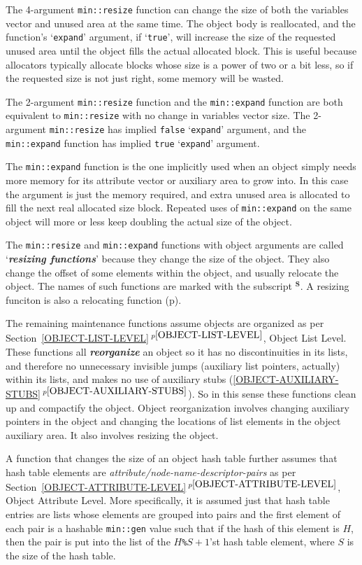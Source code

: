 \documentclass[12pt]{article}
\makeatletter
\newcommand{\skey}[2]{{\bf \em #1#2}\index{#1}}
\newcommand{\ikey}[2]{{\bf \em #1}\index{#2}}
\newcommand{\subsmkey}[2]{$\mathbf{^{#1}}$\index{#1@$^{#1}$!#2}}
\newcommand{\itemref}[1]{\ref{#1}$\,^{p\pageref{#1}}$}
\newcommand{\pagref}[1]{p\pageref{#1}}
\newcommand{\EOL}{\penalty \exhyphenpenalty}
\makeatother
\begin{document}
The 4-argument {\tt min::resize} function can change
the size of both the variables vector and unused area at the same
time.  The object body is reallocated, and the function's
`{\tt expand}' argument, if `{\tt true}', will increase
the size of the requested unused area until the object fills
the actual allocated block.  This is useful because allocators
typically allocate blocks whose size is a power of two or
a bit less, so if the requested size is not just right, some
memory will be wasted.

The 2-argument {\tt min::resize} function and the {\tt min::\EOL expand}
function are both equivalent to {\tt min::\EOL resize} with no change
in variables vector size.  The 2-argument {\tt min::\EOL resize}
has implied {\tt false} `{\tt expand}' argument, and the
{\tt min::\EOL expand} function has implied {\tt true} `{\tt expand}'
argument.

The {\tt min::expand} function is the one implicitly used when an object simply
needs more memory for its attribute vector or auxiliary area to grow into.
In this case the argument is just the memory required, and extra unused
area is allocated to fill the next real allocated size block.  Repeated
uses of {\tt min::expand} on the same object will more or less keep
doubling the actual size of the object.

The {\tt min::resize} and {\tt min::expand} functions with object arguments
are called `\skey{resizing function}s'\label{RESIZING-FUNCTIONS}
because they change the size of the object.  They also change
the offset of some elements within the object, and usually
relocate the object.
The names of such functions are marked with the subscript
\subsmkey{S}{of function}.  A resizing funciton is also
a relocating function (\pagref{RELOCATING-FUNCTIONS}).

The remaining maintenance functions assume objects are organized
as per Section~\itemref{OBJECT-LIST-LEVEL}, Object List Level.
These functions all \ikey{reorganize}{object}
an object so it has no discontinuities
in its lists, and therefore no unnecessary invisible jumps (auxiliary
list pointers, actually) within its lists, and makes no use of
auxiliary stubs (\itemref{OBJECT-AUXILIARY-STUBS}).  So in this
sense these functions clean up and compactify the object.  Object
reorganization involves changing auxiliary pointers in the object and
changing the locations of list elements in the object auxiliary area.
It also involves resizing the object.

A function that changes the size of an object hash table further
assumes that hash table elements are {\em attribute/node-name-descriptor-pairs}
as per Section~\itemref{OBJECT-ATTRIBUTE-LEVEL}, Object Attribute Level.
More specifically, it is assumed just that hash table entries are lists
whose elements are grouped into pairs and the first element of each
pair is a hashable {\tt min::gen} value such that if the hash of this
element is $H$, then the pair is put into the list of the $H$\verb|%|$S+1$'st
hash table element, where $S$ is the size of the hash table.
\end{document}
